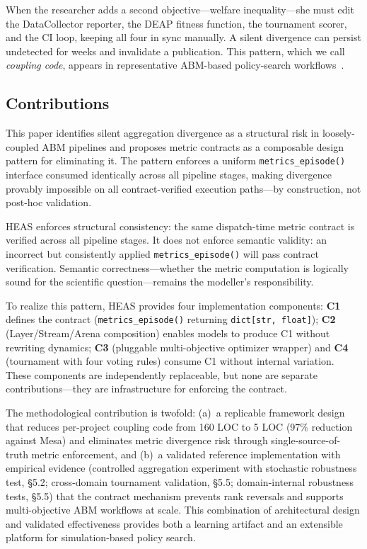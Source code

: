 \documentclass{wscpaperproc}
\begin{document}
When the researcher adds a second objective---welfare inequality---she must edit
the DataCollector reporter, the DEAP fitness function, the tournament scorer, and
the CI loop, keeping all four in sync manually. A silent divergence can persist
undetected for weeks and invalidate a publication. This pattern, which we call
\emph{coupling code}, appears in representative ABM-based policy-search
workflows~\cite{pangallo2019best,capri2023transport}.

\subsection{Contributions}
\label{sec:intro-contributions}

This paper identifies silent
aggregation divergence as a structural risk in loosely-coupled ABM pipelines and
proposes metric contracts as a composable design pattern for eliminating it. The
pattern enforces a uniform \texttt{metrics\_episode()} interface consumed identically
across all pipeline stages, making divergence provably impossible on all
contract-verified execution paths---by construction, not post-hoc validation.

HEAS enforces structural consistency: the same dispatch-time metric contract is
verified across all pipeline stages. It does not enforce semantic validity: an
incorrect but consistently applied \texttt{metrics\_episode()} will pass contract
verification. Semantic correctness---whether the metric computation is logically
sound for the scientific question---remains the modeller's responsibility.

To realize this pattern, HEAS provides four implementation components:
\textbf{C1} defines the contract (\texttt{metrics\_episode()} returning
\texttt{dict[str, float]}); \textbf{C2} (Layer/Stream/Arena composition) enables
models to produce C1 without rewriting dynamics; \textbf{C3} (pluggable multi-objective
optimizer wrapper) and \textbf{C4} (tournament with four voting rules) consume C1
without internal variation. These components are independently replaceable, but none
are separate contributions---they are infrastructure for enforcing the contract.

The methodological contribution is twofold: (a)~a replicable framework design that
reduces per-project coupling code from 160 LOC to 5 LOC (97\% reduction against Mesa)
and eliminates metric divergence risk through single-source-of-truth metric enforcement, and (b)~a validated reference
implementation with empirical evidence (controlled aggregation experiment with stochastic robustness test, \S5.2;
cross-domain tournament validation, \S5.5; domain-internal robustness tests, \S5.5) that the
contract mechanism prevents rank reversals and supports multi-objective ABM workflows
at scale. This combination of architectural design and validated effectiveness provides
both a learning artifact and an extensible platform for simulation-based policy search.
\end{document}
